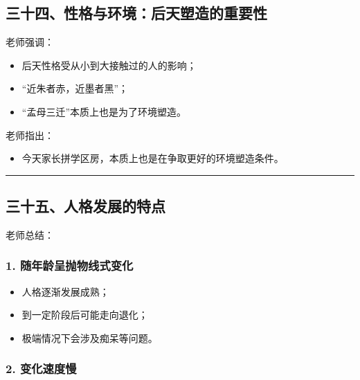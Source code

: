 \documentclass[
  chinese,
  9pt,
  a4paper,
]{ctexart}
\providecommand{\tightlist}{%
  \setlength{\itemsep}{0pt}\setlength{\parskip}{0pt}}
\begin{document}
\subsection{三十四、性格与环境：后天塑造的重要性}\label{ux4e09ux5341ux56dbux6027ux683cux4e0eux73afux5883ux540eux5929ux5851ux9020ux7684ux91cdux8981ux6027}

老师强调：

\begin{itemize}
\tightlist
\item
  后天性格受从小到大接触过的人的影响；
\item
  ``近朱者赤，近墨者黑''；
\item
  ``孟母三迁''本质上也是为了环境塑造。
\end{itemize}

老师指出：

\begin{itemize}
\tightlist
\item
  今天家长拼学区房，本质上也是在争取更好的环境塑造条件。
\end{itemize}

\begin{center}\rule{0.5\linewidth}{0.5pt}\end{center}

\subsection{三十五、人格发展的特点}\label{ux4e09ux5341ux4e94ux4ebaux683cux53d1ux5c55ux7684ux7279ux70b9}

老师总结：

\subsubsection{1.
随年龄呈抛物线式变化}\label{ux968fux5e74ux9f84ux5448ux629bux7269ux7ebfux5f0fux53d8ux5316}

\begin{itemize}
\tightlist
\item
  人格逐渐发展成熟；
\item
  到一定阶段后可能走向退化；
\item
  极端情况下会涉及痴呆等问题。
\end{itemize}

\subsubsection{2. 变化速度慢}\label{ux53d8ux5316ux901fux5ea6ux6162}
\end{document}
